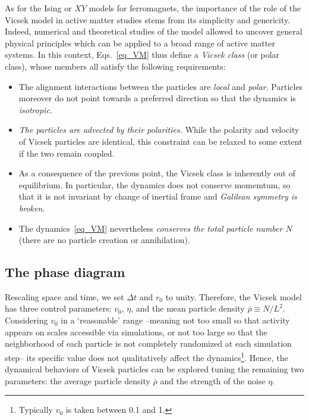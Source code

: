 As for the Ising or $XY$ models for ferromagnets, the importance of the role of the Vicsek model in active matter studies stems from its simplicity and genericity.
Indeed, numerical and theoretical studies of the model allowed to uncover general physical principles which can be applied to a broad range of active matter systems.
In this context, Eqs.~\eqref{eq_VM} thus define a {\it Vicsek class} (or polar class), whose members all satisfy the following requirements:
\begin{itemize}
\item The alignment interactions between the particles are {\it local} and {\it polar}. 
Particles moreover do not point towards a preferred direction so that the dynamics is {\it isotropic}.  
\item {\it The particles are advected by their polarities.} 
While the polarity and velocity of Vicsek particles are identical, this constraint can be relaxed to some extent if the two remain coupled.
\item As a consequence of the previous point, the Vicsek class is inherently out of equilibrium. 
In particular, the dynamics does not conserve momemtum, so that it is not invariant by change of inertial frame and {\it Galilean symmetry is broken}.
\item The dynamics~\eqref{eq_VM} nevertheless {\it conserves the total particle number $N$} (there are no particle creation or annihilation).
\end{itemize}

\subsection{The phase diagram}

\label{sec_pd}

Rescaling space and time, we set $\Delta t$ and $r_0$ to unity. 
Therefore, the Vicsek model has three control parameters: $v_0$, $\eta$, and the mean particle density $\bar{\rho} \equiv N / L^2$.
Considering $v_0$ in a `reasonable' range --meaning not too small so that activity appears on scales accessible via simulations, 
or not too large so that the neighborhood of each particle is not completely randomized at each simulation step-- its specific value does not qualitatively affect the dynamics\footnote{Typically $v_0$ is taken between 0.1 and 1.}.
Hence, the dynamical behaviors of Vicsek particles can be explored tuning the remaining two parameters: the average particle density $\bar{\rho}$ and the strength of the noise $\eta$.

